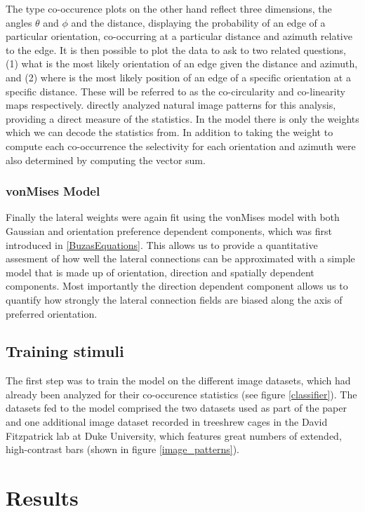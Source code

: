 The \cite{Geisler2001} type co-occurence plots on the other hand
reflect three dimensions, the angles $\theta$ and $\phi$ and the
distance, displaying the probability of an edge of a particular
orientation, co-occurring at a particular distance and azimuth
relative to the edge. It is then possible to plot the data to ask to
two related questions, (1) what is the most likely orientation of an
edge given the distance and azimuth, and (2) where is the most likely
position of an edge of a specific orientation at a specific
distance. These will be referred to as the co-circularity and
co-linearity maps respectively. \citep{Geisler2001} directly analyzed
natural image patterns for this analysis, providing a direct measure
of the statistics. In the model there is only the weights which we can
decode the statistics from. In addition to taking the weight to
compute each co-occurrence the selectivity for each orientation and
azimuth were also determined by computing the vector sum.

\subsubsection{vonMises Model}

Finally the lateral weights were again fit using the vonMises model
with both Gaussian and orientation preference dependent components,
which was first introduced in \ref{BuzasEquations}. This allows us to
provide a quantitative assesment of how well the lateral connections
can be approximated with a simple model that is made up of
orientation, direction and spatially dependent components. Most
importantly the direction dependent component allows us to quantify
how strongly the lateral connection fields are biased along the axis
of preferred orientation.

\subsection{Training stimuli}

The first step was to train the model on the different image datasets,
which had already been analyzed for their co-occurence statistics (see
figure \ref{classifier}). The datasets fed to the model comprised the
two datasets used as part of the paper and one additional image
dataset recorded in treeshrew cages in the David Fitzpatrick lab at
Duke University, which features great numbers of extended,
high-contrast bars (shown in figure \ref{image_patterns}).

\section{Results}

